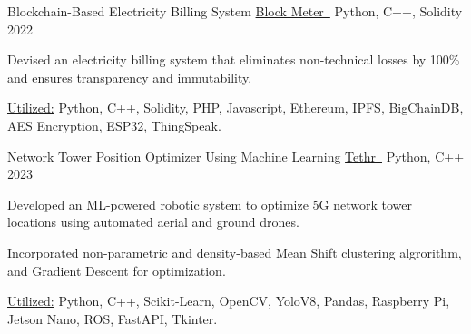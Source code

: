 \begin{cventries}
  \cventryprojects
  {Blockchain-Based Electricity Billing System } %
  {\href{https://www.hamidurrk.com/projects?project=block-meter}{Block Meter\ {\mdseries\faExternalLink}}} %
  {Python, C++, Solidity} %
  {2022} %
  {
    \begin{cvitems} %
      \item { Devised an electricity billing system that eliminates non-technical losses by 100\% and ensures transparency and immutability.}
      \item {\underline{Utilized:} Python, C++, Solidity, PHP, Javascript, Ethereum, IPFS, BigChainDB, AES Encryption, ESP32, ThingSpeak.}
    \end{cvitems}
    }
          
  \cventryprojects
    {Network Tower Position Optimizer Using Machine Learning} %
    {\href{https://www.hamidurrk.com/projects?project=tethr}{Tethr\ {\mdseries\faExternalLink}}} %
    {Python, C++} %
    {2023} %
    {
      \begin{cvitems} %
        \item {Developed an ML-powered robotic system to optimize 5G network tower locations using automated aerial and ground drones.}
        \item {Incorporated non-parametric and density-based Mean Shift clustering algrorithm, and Gradient Descent 
        for optimization.}
        \item {\underline{Utilized:} Python, C++, Scikit-Learn, OpenCV, YoloV8, Pandas, Raspberry Pi, Jetson Nano, ROS, FastAPI, Tkinter.}
      \end{cvitems}
    }
        

\end{cventries}
